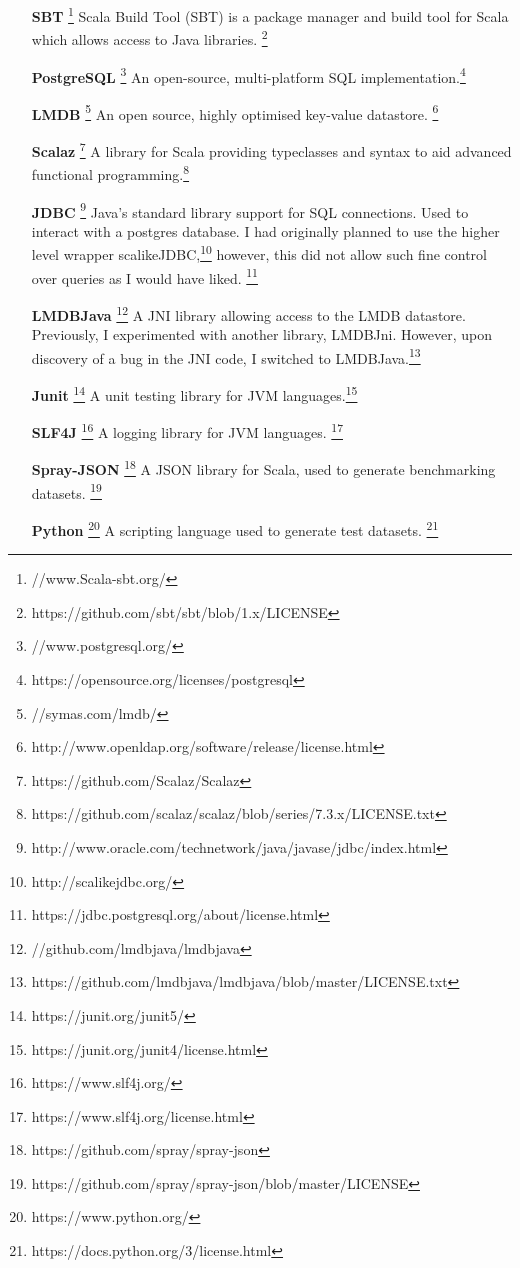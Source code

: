 \documentclass[12pt,a4paper,twoside,openright]{report}
\begin{document}
\begin{itemize}
\item[\textbf{SBT}]\footnote{//www.Scala-sbt.org/} Scala Build Tool (SBT) is a package manager and build tool for Scala which allows access to Java libraries. \footnote{https://github.com/sbt/sbt/blob/1.x/LICENSE}

\item[\textbf{PostgreSQL}]\footnote{//www.postgresql.org/} An open-source, multi-platform SQL implementation.\footnote{https://opensource.org/licenses/postgresql}

\item[\textbf{LMDB}]\footnote{//symas.com/lmdb/} An open source, highly optimised key-value datastore. \footnote{http://www.openldap.org/software/release/license.html}

\item[\textbf{Scalaz}]\footnote{https://github.com/Scalaz/Scalaz} A library for Scala providing typeclasses and syntax to aid advanced functional programming.\footnote{https://github.com/scalaz/scalaz/blob/series/7.3.x/LICENSE.txt}

\item[\textbf{JDBC}]\footnote{http://www.oracle.com/technetwork/java/javase/jdbc/index.html} Java's standard library support for SQL connections. Used to interact with a postgres database. I had originally planned to use the higher level wrapper scalikeJDBC,\footnote{http://scalikejdbc.org/} however, this did not allow such fine control over queries as I would have liked. \footnote{https://jdbc.postgresql.org/about/license.html}

\item[\textbf{LMDBJava}]\footnote{//github.com/lmdbjava/lmdbjava} A JNI library allowing access to the LMDB datastore. Previously, I experimented with another library, LMDBJni. However, upon discovery of a bug in the JNI code, I switched to LMDBJava.\footnote{https://github.com/lmdbjava/lmdbjava/blob/master/LICENSE.txt}

\item[\textbf{Junit}]\footnote{https://junit.org/junit5/} A unit testing library for JVM languages.\footnote{https://junit.org/junit4/license.html}

\item[\textbf{SLF4J}]\footnote{https://www.slf4j.org/} A logging library for JVM languages. \footnote{https://www.slf4j.org/license.html}

\item[\textbf{Spray-JSON}]\footnote{https://github.com/spray/spray-json} A JSON library for Scala, used to generate benchmarking datasets. \footnote{https://github.com/spray/spray-json/blob/master/LICENSE}

\item[\textbf{Python}]\footnote{https://www.python.org/} A scripting language used to generate test datasets. \footnote{https://docs.python.org/3/license.html}


\end{itemize}
\end{document}
